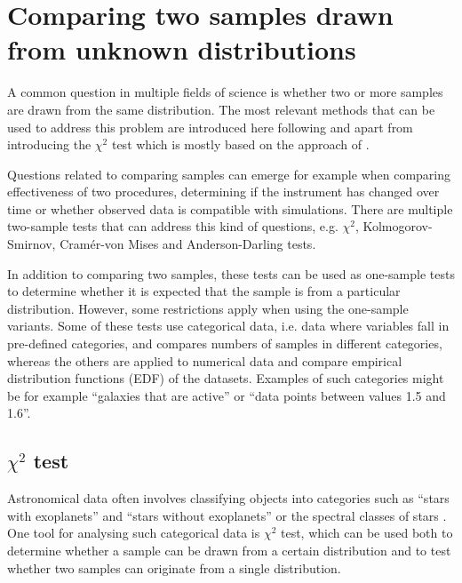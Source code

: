 \documentclass[english, oneside]{HYgradu}
\begin{document}
\section{Comparing two samples drawn from unknown distributions} \label{sect:statistical_tests}
A common question in multiple fields of science is whether two or more samples are drawn from the same distribution. The most relevant methods that can be used to address this problem are introduced here following \citet{bohm2010introduction} and \citet{feigelson2012modern} apart from introducing the $\chi^2$ test which is mostly based on the approach of \citet{corder2014nonparametric}.

Questions related to comparing samples can emerge for example when comparing effectiveness of two procedures, determining if the instrument has changed over time or whether observed data is compatible with simulations. There are multiple two-sample tests that can address this kind of questions, e.g. $\chi^2$, Kolmogorov-Smirnov, Cram\'er-von Mises and Anderson-Darling tests. 

In addition to comparing two samples, these tests can be used as one-sample tests to determine whether it is expected that the sample is from a particular distribution. However, some restrictions apply when using the one-sample variants. Some of these tests use categorical data, i.e. data where variables fall in pre-defined categories, and compares numbers of samples in different categories, whereas the others are applied to numerical data and compare empirical distribution functions (EDF) of the datasets. Examples of such categories might be for example ``galaxies that are active'' or ``data points between values 1.5 and 1.6''.


\subsection{$\chi^2$ test}
Astronomical data often involves classifying objects into categories such as ``stars with exoplanets'' and ``stars without exoplanets'' or the spectral classes of stars  \citep{feigelson2012modern}. One tool for analysing such categorical data is $\chi^2$ test, which can be used both to determine whether a sample can be drawn from a certain distribution and to test whether two samples can originate from a single distribution. 
\end{document}
